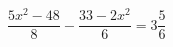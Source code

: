 \begin{ex}
	\begin{condition}
		\( \dfrac{5x^2-48}{8}-\dfrac{33-2x^2}{6}=3\dfrac{5}{6} \)
	\end{condition}
\end{ex}